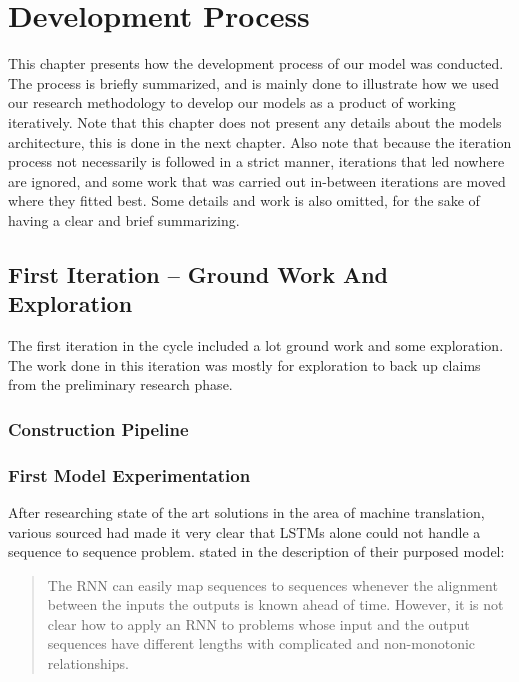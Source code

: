 
\chapter{Development Process}
\label{ch:development_process}
This chapter presents how the development process of our model was conducted. The process is briefly summarized, and is mainly done to illustrate how we used our research methodology to develop our models as a product of working iteratively. Note that this chapter does not present any details about the models architecture, this is done in the next chapter. Also note that because the iteration process not necessarily is followed in a strict manner, iterations that led nowhere are ignored, and some work that was carried out in-between iterations are moved where they fitted best. Some details and work is also omitted, for the sake of having a clear and brief summarizing.


\section{First Iteration -- Ground Work And Exploration}
The first iteration in the cycle included a lot ground work and some exploration. The work done in this iteration was mostly for exploration to back up claims from the preliminary research phase.

\subsection{Construction Pipeline}
\label{sec:construction_pipeline}




\subsection{First Model Experimentation}
After researching state of the art solutions in the area of machine translation, various sourced had made it very clear that LSTMs alone could not handle a sequence to sequence problem. \citep{sutskever2014sequence} stated in the description of their purposed model:

\begin{quote}
    The RNN can easily map sequences to sequences whenever the alignment between the inputs the outputs is known ahead of time. However, it is not clear how to apply an RNN to problems whose input and the output sequences have different lengths with complicated and non-monotonic relationships.
\end{quote}

